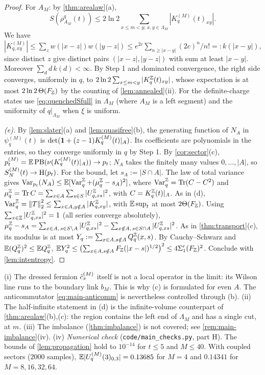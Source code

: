 \begin{proof}
For $A_M$: by \cref{thm:arealaw}(a),
\[
  S(\rho^q_{A_M}(t))\le2\ln2\sum_{x\le m<y;\,x,y\in\Lambda_M}|K^{(M)}_q(t)_{xy}| .
\]
We have
$|K^{(M)}_{q,xy}|\le\sum_zw(|x-z|)w(|y-z|)\le e^{2c}\sum_{n\ge|x-y|}(2c)^n/n!=:k(|x-y|)$, since distinct $z$ give distinct
pairs $(|x-z|,|y-z|)$ with sum at least $|x-y|$.  Moreover $\sum_dd\,k(d)<\infty$.  By Step 1 and dominated convergence,
the right side converges, uniformly in $q$, to $2\ln2\sum_{x\le m<y}|K^{\mathbb{Z}}_q(t)_{xy}|$, whose expectation is at most
$2\ln2\,\Theta(F_{\mathbb{Z}})$ by the counting of \cref{lem:annealed}(ii).  For the definite-charge states use
\eqref{eq:quenchedSfull} in $\Lambda_M$ (where $A_M$ is a left segment) and the uniformity of $q|_{\Lambda_M}$ when $\xi$ is
uniform.

\emph{(e).}  By \cref{lem:slater}(a) and \cref{lem:quasifree}(b), the generating function of $N_A$ in $\psi^{(M)}_q(t)$ is
$\det(\mathbf{1}+(z-1)K^{(M)}_q(t)|_A)$.  Its coefficients are polynomials in the entries, so they converge uniformly in $q$
by Step 1.  By \cref{cor:sector}(c), $p^{(M)}_t=\mathbb{E}\,\mathrm{PB}(\nu(K^{(M)}_q(t)|_A))\to p_t$; $N_A$ takes the finitely
many values $0,\dots,|A|$, so $S_{N}^{(M)}(t)\to\mathrm{H}(p_t)$.  For the bound, let $s_A:=|S\cap A|$.  The law of total
variance gives $\operatorname{Var}_{p_t}(N_A)\le\mathbb{E}[\operatorname{Var}^{\mathbb{Z}}_q+(\mu^{\mathbb{Z}}_q-s_A)^2]$, where $\operatorname{Var}^{\mathbb{Z}}_q=\operatorname{Tr}(C-C^2)$ and
$\mu^{\mathbb{Z}}_q=\operatorname{Tr} C=\sum_{x\in A}\sum_{s\in S}|U^{\mathbb{Z}}_{q,xs}|^2$, with $C=K^{\mathbb{Z}}_q(t)|_A$.  As in (d),
$\operatorname{Var}^{\mathbb{Z}}_q=\left\|T\right\|_2^2\le\sum_{x\in A,y\notin A}|K^{\mathbb{Z}}_{q,xy}|$, with $\mathbb{E}\sup_t$ at most $2\Theta(F_{\mathbb{Z}})$.  Using
$\sum_{x\in\mathbb{Z}}|U^{\mathbb{Z}}_{q,xs}|^2=1$ (all series converge absolutely),
$\mu^{\mathbb{Z}}_q-s_A=\sum_{x\in A,\,s\in S\setminus A}|U^{\mathbb{Z}}_{q,xs}|^2-\sum_{x\notin A,\,s\in S\cap A}|U^{\mathbb{Z}}_{q,xs}|^2$.  As in
\cref{thm:transport}(c), its modulus is at most $Y_q:=\sum_{x\in A,s\notin A}Q^{\mathbb{Z}}_q(x,s)$.  By Cauchy--Schwarz and
$\mathbb{E}(Q^{\mathbb{Z}}_q)^2\le\mathbb{E} Q^{\mathbb{Z}}_q$,
$\mathbb{E} Y_q^2\le\bigl(\sum_{x\in A,s\notin A}F_{\mathbb{Z}}(|x-s|)^{1/2}\bigr)^2\le4\Sigma'_1(F_{\mathbb{Z}})^2$.  Conclude with
\cref{lem:intentropy}.
\end{proof}

\begin{remark}\label{rem:main-infvol}
(i) The dressed fermion $\tilde c^{(M)}_x$ itself is not a local operator in the limit: its Wilson line runs to the boundary link
$b_M$.  This is why (c) is formulated for even $A$.  The anticommutator \eqref{eq:main-anticomm} is nevertheless
controlled through (b).
(ii) The half-infinite statement in (d) is the infinite-volume counterpart of \cref{thm:arealaw}(b),(c): the region
contains the left end of $\Lambda_M$ and has a single cut, at $m$.
(iii) The imbalance (\cref{thm:imbalance}) is not covered; see \cref{rem:main-imbalance}(iv).
(iv) \emph{Numerical check} (\texttt{code/main\_checks.py}, part H).  The bounds of \cref{lem:propagation} hold to
$10^{-14}$ for $t\le5$ and $M\le40$.  With coupled sectors ($2000$ samples), $\mathbb{E}|U^{(M)}_q(3)_{0,3}|=0.13685$ for $M=4$ and $0.14341$ for
$M=8,16,32,64$.
\end{remark}

